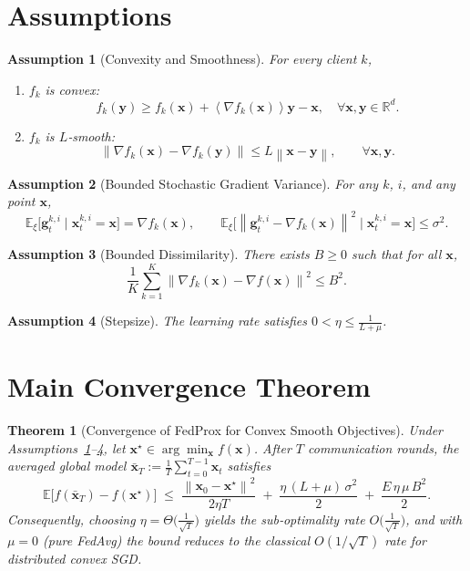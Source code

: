 \documentclass{article}
\newtheorem{theorem}{Theorem}
\newtheorem{assumption}{Assumption}
\newcommand{\E}{\mathbb{E}}
\newcommand{\R}{\mathbb{R}}
\newcommand{\norm}[1]{\left\lVert #1\right\rVert}
\newcommand{\inner}[1]{\left\langle #1\right\rangle}
\begin{document}
\section*{Assumptions}
\begin{assumption}[Convexity and Smoothness]\label{ass:convex_smooth}
For every client $k$,
\begin{enumerate}[label=(\alph*)]
    \item $f_k$ is convex:
          \[
          f_k(\bm{y})\ge f_k(\bm{x})+\inner{\nabla f_k(\bm{x})}{\bm{y}-\bm{x}},\quad\forall\bm{x},\bm{y}\in\R^{d}.
          \]
    \item $f_k$ is $L$‑smooth:
          \[
          \norm{\nabla f_k(\bm{x})-\nabla f_k(\bm{y})}\le L\norm{\bm{x}-\bm{y}},\qquad\forall\bm{x},\bm{y}.
          \]
\end{enumerate}
\end{assumption}

\begin{assumption}[Bounded Stochastic Gradient Variance]\label{ass:variance}
For any $k$, $i$, and any point $\bm{x}$,
\[
\E_{\xi}\!\bigl[\bm{g}_{t}^{k,i}\mid \bm{x}_{t}^{k,i}=\bm{x}\bigr]=\nabla f_k(\bm{x}),\qquad
\E_{\xi}\!\bigl[\norm{\bm{g}_{t}^{k,i}-\nabla f_k(\bm{x})}^2\mid \bm{x}_{t}^{k,i}=\bm{x}\bigr]\le\sigma^2 .
\]
\end{assumption}

\begin{assumption}[Bounded Dissimilarity]\label{ass:dissimilarity}
There exists $B\ge0$ such that for all $\bm{x}$,
\[
\frac1K\sum_{k=1}^K \norm{\nabla f_k(\bm{x})-\nabla f(\bm{x})}^2\le B^2 .
\]
\end{assumption}

\begin{assumption}[Stepsize]\label{ass:stepsize}
The learning rate satisfies $0<\eta\le \frac{1}{L+\mu}$.
\end{assumption}

\section*{Main Convergence Theorem}
\begin{theorem}[Convergence of FedProx for Convex Smooth Objectives]\label{thm:main}
Under Assumptions~\ref{ass:convex_smooth}--\ref{ass:stepsize},
let $\bm{x}^\star\in\arg\min_{\bm{x}} f(\bm{x})$.  After $T$ communication rounds,
the averaged global model $\bar{\bm{x}}_T:=\frac1T\sum_{t=0}^{T-1}\bm{x}_t$ satisfies
\[
\E\!\bigl[f(\bar{\bm{x}}_T)-f(\bm{x}^\star)\bigr]
   \;\le\;
   \frac{\norm{\bm{x}_0-\bm{x}^\star}^2}{2\eta T}
   \;+\;
   \frac{\eta\, (L+\mu) \, \sigma^2}{2}
   \;+\;
   \frac{E\,\eta\,\mu\,B^2}{2}.
\]
Consequently, choosing $\eta=\Theta\!\bigl(\tfrac{1}{\sqrt{T}}\bigr)$ yields the
sub‑optimality rate $O\!\bigl(\tfrac{1}{\sqrt{T}}\bigr)$, and with
$\mu=0$ (pure FedAvg) the bound reduces to the classical $O(1/\sqrt{T})$
rate for distributed convex SGD.
\end{theorem}
\end{document}
